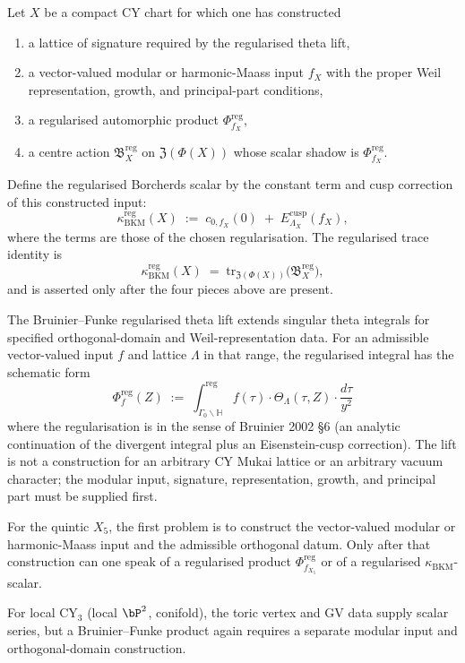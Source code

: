 \begin{conjecture}
\label{conj:universal-trace-non-k3-fibered}
\ClaimStatusConjectured
Let \(X\) be a compact CY chart for which one has constructed
\begin{enumerate}[label=\textup{(\roman*)}]
\item a lattice of signature required by the regularised theta lift,
\item a vector-valued modular or harmonic-Maass input \(f_X\) with the
proper Weil representation, growth, and principal-part conditions,
\item a regularised automorphic product \(\Phi^{\mathrm{reg}}_{f_X}\),
\item a centre action \(\mathfrak B_X^{\mathrm{reg}}\) on
\(\mathfrak Z(\Phi(X))\) whose scalar shadow is
\(\Phi^{\mathrm{reg}}_{f_X}\).
\end{enumerate}
Define the regularised Borcherds scalar by the constant term and cusp
correction of this constructed input:
\[
 \kappa_{\mathrm{BKM}}^{\mathrm{reg}}(X)
 \;:=\; c_{0,f_X}(0) \;+\; E_{\Lambda_X}^{\mathrm{cusp}}(f_X),
\]
where the terms are those of the chosen regularisation.  The regularised
trace identity is
\[
 \kappa_{\mathrm{BKM}}^{\mathrm{reg}}(X) \;=\; \mathrm{tr}_{\mathfrak{Z}(\Phi(X))}\bigl(\mathfrak{B}_X^{\mathrm{reg}}\bigr),
\]
and is asserted only after the four pieces above are present.
\end{conjecture}

\begin{remark}
\label{rem:bruinier-funke-structural-shape}
The Bruinier--Funke regularised theta lift extends singular theta
integrals for specified orthogonal-domain and Weil-representation data.
For an admissible vector-valued input \(f\) and lattice \(\Lambda\) in
that range, the regularised integral has the schematic form
\[
 \Phi_f^{\mathrm{reg}}(Z) \;:=\; \int^{\mathrm{reg}}_{\Gamma_0 \backslash \mathbb{H}} f(\tau) \cdot \Theta_\Lambda(\tau, Z) \cdot \frac{d\tau}{y^2}
\]
where the regularisation is in the sense of Bruinier 2002 \S 6 \textup{(}an
analytic continuation of the divergent integral plus an Eisenstein-cusp
correction\textup{).} The lift is not a construction for an arbitrary CY
Mukai lattice or an arbitrary vacuum character; the modular input,
signature, representation, growth, and principal part must be supplied
first.

For the quintic \(X_5\), the first problem is to construct the
vector-valued modular or harmonic-Maass input and the admissible
orthogonal datum.  Only after that construction can one speak of a
regularised product \(\Phi^{\mathrm{reg}}_{f_{X_5}}\) or of a
regularised \(\kappa_{\mathrm{BKM}}\)-scalar.

For local CY$_3$ \textup{(}local \(\bP^2\), conifold\textup{)}, the toric
vertex and GV data supply scalar series, but a Bruinier--Funke product
again requires a separate modular input and orthogonal-domain
construction.
\end{remark}


